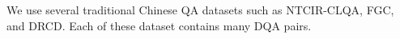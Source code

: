 We use several traditional Chinese QA datasets such as NTCIR-CLQA, FGC, and DRCD. Each of these dataset contains many DQA pairs.